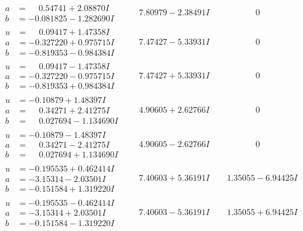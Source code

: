 \documentclass[1p]{elsarticle_modified}
\theoremstyle{definition}
\begin{document}
$$\begin{array}{c|c|c}
\begin{aligned}
a &= \phantom{-}0.54741 + 2.08870 I \\
b &= -0.081825 - 1.282690 I\end{aligned}
 & \phantom{-}7.80979 - 2.38491 I & \phantom{-0.000000 } 0 \\ \hline\begin{aligned}
u &= \phantom{-}0.09417 + 1.47358 I \\
a &= -0.327220 + 0.975715 I \\
b &= -0.819353 - 0.984384 I\end{aligned}
 & \phantom{-}7.47427 - 5.33931 I & \phantom{-0.000000 } 0 \\ \hline\begin{aligned}
u &= \phantom{-}0.09417 - 1.47358 I \\
a &= -0.327220 - 0.975715 I \\
b &= -0.819353 + 0.984384 I\end{aligned}
 & \phantom{-}7.47427 + 5.33931 I & \phantom{-0.000000 } 0 \\ \hline\begin{aligned}
u &= -0.10879 + 1.48397 I \\
a &= \phantom{-}0.34271 + 2.41275 I \\
b &= \phantom{-}0.027694 - 1.134690 I\end{aligned}
 & \phantom{-}4.90605 + 2.62766 I & \phantom{-0.000000 } 0 \\ \hline\begin{aligned}
u &= -0.10879 - 1.48397 I \\
a &= \phantom{-}0.34271 - 2.41275 I \\
b &= \phantom{-}0.027694 + 1.134690 I\end{aligned}
 & \phantom{-}4.90605 - 2.62766 I & \phantom{-0.000000 } 0 \\ \hline\begin{aligned}
u &= -0.195535 + 0.462414 I \\
a &= -3.15314 - 2.03501 I \\
b &= -0.151584 + 1.319220 I\end{aligned}
 & \phantom{-}7.40603 + 5.36191 I & \phantom{-}1.35055 - 6.94425 I \\ \hline\begin{aligned}
u &= -0.195535 - 0.462414 I \\
a &= -3.15314 + 2.03501 I \\
b &= -0.151584 - 1.319220 I\end{aligned}
 & \phantom{-}7.40603 - 5.36191 I & \phantom{-}1.35055 + 6.94425 I \\ \hline\begin{aligned}

\end{aligned}
\end{array}$$
\end{document}
